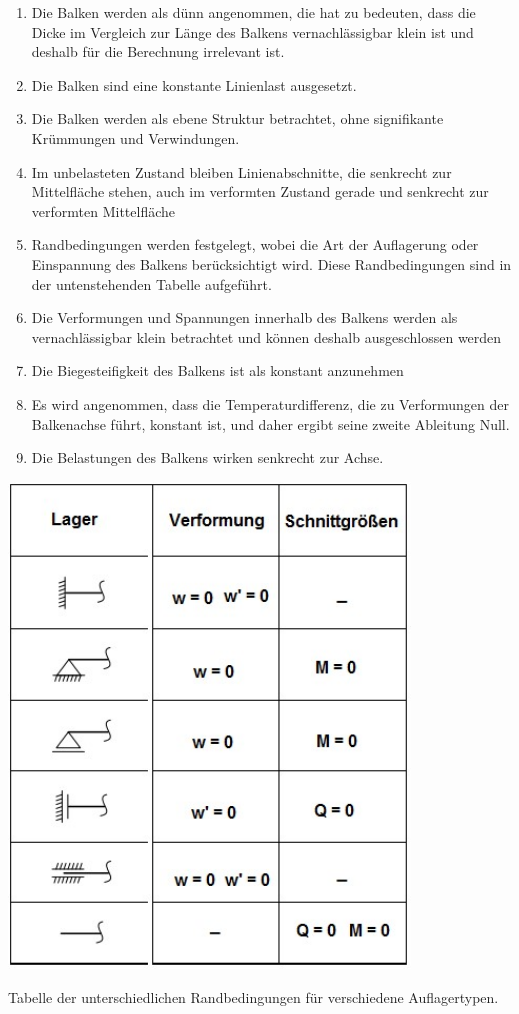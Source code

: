 \begin{enumerate}
	\item Die Balken werden als dünn angenommen, die hat zu bedeuten, dass die Dicke im Vergleich zur Länge des Balkens vernachlässigbar klein ist und deshalb für die Berechnung irrelevant ist.
	\item Die Balken sind eine konstante Linienlast ausgesetzt.
	\item Die Balken werden als ebene Struktur betrachtet, ohne signifikante Krümmungen und Verwindungen.
	\item Im unbelasteten Zustand bleiben Linienabschnitte, die senkrecht zur Mittelfläche stehen, auch im verformten Zustand gerade und senkrecht zur verformten Mittelfläche
	\item Randbedingungen werden festgelegt, wobei die Art der Auflagerung oder Einspannung des Balkens berücksichtigt wird.
	Diese Randbedingungen sind in der untenstehenden Tabelle aufgeführt.
	\item Die Verformungen und Spannungen innerhalb des Balkens werden als vernachlässigbar klein betrachtet und können deshalb ausgeschlossen werden
	\item Die Biegesteifigkeit des Balkens ist als konstant anzunehmen
	\item Es wird angenommen, dass die Temperaturdifferenz, die zu Verformungen der Balkenachse führt, konstant ist, und daher ergibt seine zweite Ableitung Null.
	\item Die Belastungen des Balkens wirken senkrecht zur Achse.
\end{enumerate}
\begin{center}
	\includegraphics[width=0.8\textwidth]{papers/balken/images/teil2/Randbedingungen.jpg}
\end{center}
\caption{Tabelle der unterschiedlichen Randbedingungen für verschiedene Auflagertypen.}